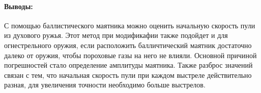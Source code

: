 \documentclass[a4paper, 10pt]{article}%
\begin{document}
	\paragraph{Выводы:}
	С помощью баллистического маятника можно оценить начальную скорость пули из духового ружья. Этот метод при модификафии также подойдет и для огнестрельного оружия, если расположить балличтический маятник достаточно далеко от оружия, чтобы пороховые газы на него не влияли. Основной причиной погрешностей стало определение амплитуды маятника. Также разброс значений связан с тем, что начальная скорость пули при каждом выстреле действительно разная, для увеличения точности необходимо больше выстрелов.
\end{document}
